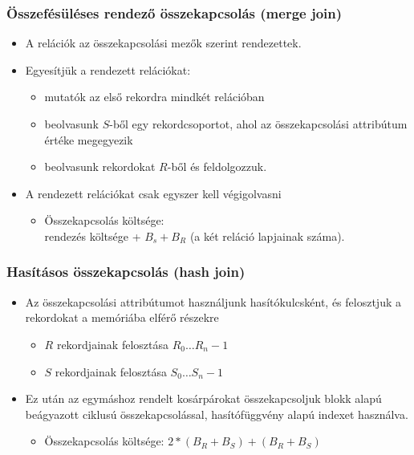 \documentclass[12pt,margin=0px]{article}
\begin{document}
	\subsubsection*{Összefésüléses rendező összekapcsolás (merge join)}
        \begin{itemize}
            \item A relációk az összekapcsolási mezők szerint rendezettek.
            \item Egyesítjük a rendezett relációkat:
            \begin{itemize}
                \item mutatók az első rekordra mindkét relációban
                \item beolvasunk $S$-ből egy rekordcsoportot, ahol az összekapcsolási attribútum értéke megegyezik
                \item beolvasunk rekordokat $R$-ből és feldolgozzuk.
            \end{itemize}
            \item A rendezett relációkat csak egyszer kell végigolvasni
            \begin{itemize}
                \item Összekapcsolás költsége:\\
                rendezés költsége + $B_s + B_R$ (a két reláció lapjainak száma).
            \end{itemize}
        \end{itemize}

	\subsubsection*{Hasításos összekapcsolás (hash join)}
        \begin{itemize}
            \item Az összekapcsolási attribútumot használjunk hasítókulcsként, és felosztjuk a rekordokat a memóriába elférő részekre
            \begin{itemize}
                \item $R$ rekordjainak felosztása $R_0\ldots R_n-1$
                \item $S$ rekordjainak felosztása $S_0\ldots S_n-1$
            \end{itemize}
            \item Ez után az egymáshoz rendelt kosárpárokat összekapcsoljuk blokk alapú beágyazott ciklusú összekapcsolással, hasítófüggvény alapú indexet használva.
            \begin{itemize}
                \item Összekapcsolás költsége: $2 * (B_R + B_S) + (B_R + B_S)$
            \end{itemize}
        \end{itemize}
	
\end{document}
